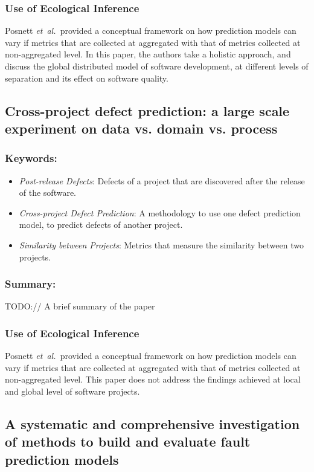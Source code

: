 \documentclass{sig-alternate-05-2015}
\newcommand{\etal}{\mbox{\emph{et al.\ }}}
\begin{document}
\subsubsection{Use of Ecological Inference}
Posnett \etal provided a conceptual framework on how prediction models can vary if metrics that are collected at aggregated with that of metrics collected at non-aggregated level. In this paper, the authors take a holistic approach, and discuss the global distributed model of software development, at different levels of separation and its effect on software quality.

\subsection{Cross-project defect prediction: a large scale experiment on data vs. domain vs. process \cite{Zimmerman:2009}}

\subsubsection{Keywords:}
\begin{itemize}
\item \emph{Post-release Defects}: Defects of a project that are discovered after the release of the software.
\item \emph{Cross-project Defect Prediction}: A methodology to use one defect prediction model, to predict defects of another project.
\item \emph{Similarity between Projects}: Metrics that measure the similarity between two projects.
\end{itemize} 

\subsubsection{Summary:}
TODO:// A brief summary of the paper

\subsubsection{Use of Ecological Inference}
Posnett \etal provided a conceptual framework on how prediction models can vary if metrics that are collected at aggregated with that of metrics collected at non-aggregated level. This paper does not address the findings achieved at local and global level of software projects.

\subsection{A systematic and comprehensive investigation of methods to build and evaluate fault prediction models \cite{Arisholm:2010}}
\end{document}
